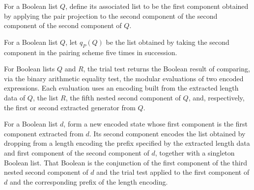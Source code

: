 \begin{definition}
\leanok
{}
For a Boolean list $Q$, define its associated list to be the first component obtained by
applying the pair projection to the second component of the second component of the
second component of $Q$.
\end{definition}

\begin{definition}
\label{Randomized.PIT.qP}
\leanok
{}
For a Boolean list $Q$, let $q_P(Q)$ be the list obtained by taking the second component
in the pairing scheme five times in succession.
\end{definition}

\begin{definition}
\label{Randomized.PIT.trialTest}
\leanok
{}
For Boolean lists $Q$ and $R$, the trial test returns the Boolean result of comparing,
via the binary arithmetic equality test, the modular evaluations of two encoded
expressions. Each evaluation uses an encoding built from the extracted length data of
$Q$, the list $R$, the fifth nested second component of $Q$, and, respectively, the
first or second extracted generator from $Q$.
\end{definition}

\begin{definition}
\label{Randomized.PIT.trStep}
\leanok
{}
For a Boolean list $d$, form a new encoded state whose first component is the first
component extracted from $d$. Its second component encodes the list obtained by dropping
from a length encoding the prefix specified by the extracted length data and first
component of the second component of $d$, together with a singleton Boolean list. That
Boolean is the conjunction of the first component of the third nested second component
of $d$ and the trial test applied to the first component of $d$ and the corresponding
prefix of the length encoding.
\end{definition}


